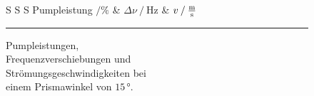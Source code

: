 \begin{figure} 
    \begin{minipage}[t]{.5\textwidth}
    \centering
    \begin{table}[H]
        \centering
        \captionsetup{justification=centering}
        \caption{Pumpleistungen, \\Frequenzverschiebungen und \\ Strömungsgeschwindigkeiten bei \\ einem Prismawinkel von $15 \,°$.}
        \label{tab:1winkel1} 
       \begin{tabular}{S S S}
        \toprule 
        {Pumpleistung $\mathbin{/}\%$} & {$\Delta \nu \mathbin{/} \unit{\hertz}$} & {$v \mathbin{/} \unit{\frac{\meter}{\second}}$}  \\
        \midrule 
        \bottomrule
       \end{tabular} 
    \end{table}
    \end{minipage}
    \begin{minipage}[t]{.5\textwidth} 
        \centering
        \vspace*{0pt}\rule{.95\textwidth}{12em} %
        \captionsetup{justification=centering}
    \end{minipage} 
\end{figure} 



